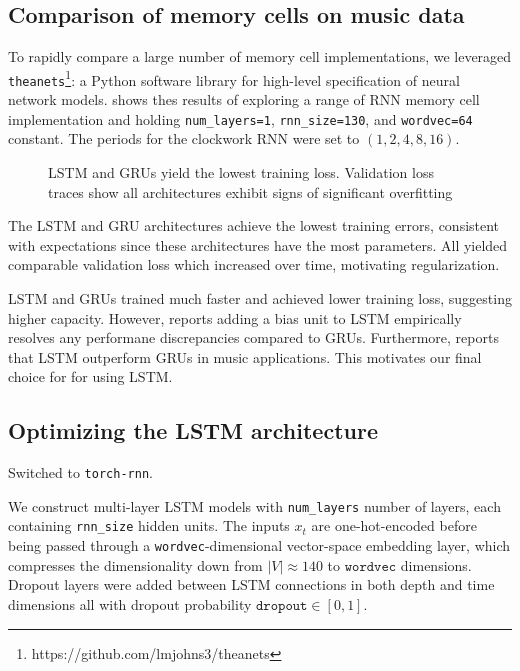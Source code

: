 \subsection{Comparison of memory cells on music data}


To rapidly compare a large number of memory cell implementations, we leveraged
\texttt{theanets}\footnote{https://github.com/lmjohns3/theanets}: a Python
software library for high-level specification of neural network models. 
shows thes results of exploring a range of RNN memory cell implementation and
holding \texttt{num\_layers=1}, \texttt{rnn\_size=130}, and \texttt{wordvec=64}
constant. The periods for the clockwork RNN \citep{cho2014learning} were set to
$(1, 2, 4, 8, 16)$.

\begin{figure}[tb]
    \centering
    
    \caption{LSTM and GRUs yield the lowest training loss. Validation loss
      traces show all architectures exhibit signs of significant overfitting}
    \label{fig:theanets-architecture}
\end{figure}

The LSTM and GRU architectures achieve the lowest training errors, consistent
with expectations since these architectures have the most parameters. All
yielded comparable validation loss which increased over time, motivating
regularization.

LSTM and GRUs trained much faster and achieved lower training loss, suggesting
higher capacity. However, \citet{zaremba2015empirical} reports adding a bias unit to LSTM empirically
resolves any performane discrepancies compared to GRUs. Furthermore, \citet{Nayebi2015} reports
that LSTM outperform GRUs in music applications. This motivates our final choice for
for using LSTM.

\subsection{Optimizing the LSTM architecture}
\label{sec:lstm-grid-search}

Switched to \texttt{torch-rnn}. 

We construct multi-layer LSTM models with \texttt{num\_layers} number of
layers, each containing \texttt{rnn\_size} hidden units. The inputs $x_t$ are
one-hot-encoded before being passed through a \texttt{wordvec}-dimensional
vector-space embedding layer, which compresses the dimensionality down from
$|V| \approx 140$ to $\texttt{wordvec}$ dimensions. Dropout layers were added
between LSTM connections in both depth and time dimensions all with dropout
probability $\texttt{dropout} \in [0,1]$.

